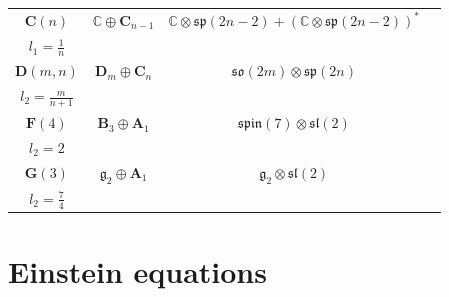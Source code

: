 \documentclass[reqno]{amsart}
\theoremstyle{definition}
\begin{document}
\begin{table}[htbp]
{{\begin{tabular}{|c|c|c|c|}
\\
\hline
$\mathbf{C}(n)$  &  $\mathbb{C}\oplus \mathbf{C}_{n-1}$                       &  $\mathbb{C}\otimes\mathfrak{sp}(2n-2)+(\mathbb{C}\otimes\mathfrak{sp}(2n-2))^{\ast}$
                                                                              &  \makecell{$l_{0}=\infty$\\
                                                                                           $l_{1}=\frac{1}{n}$}
\\
\hline
$\mathbf{D}(m,n)$  &  $\mathbf{D}_{m}\oplus \mathbf{C}_{n}$  & $\mathfrak{so}(2m)\otimes\mathfrak{sp}(2n)$
                                                                              &  \makecell{$l_{1}=\frac{n}{m-1}$\\
                                                                                           $l_{2}=\frac{m}{n+1}$}
\\
\hline
$\mathbf{F}(4)$  &  $\mathbf{B}_{3}\oplus \mathbf{A}_{1}$  & $\mathfrak{spin}(7)\otimes\mathfrak{sl}(2)$
                                                                              &  \makecell{$l_{1}=\frac{2}{5}$\\
                                                                                           $l_{2}=2$}
\\
\hline
$\mathbf{G}(3)$  &  $\mathfrak{g}_{2}\oplus \mathbf{A}_{1}$  & $\mathfrak{g}_{2}\otimes\mathfrak{sl}(2)$
                                                                              &  \makecell{$l_{1}=\frac{1}{2}$\\
                                                                                           $l_{2}=\frac{7}{4}$}
\\
\hline
\end{tabular}}}
\end{table}

\section{Einstein equations}\label{sect3}
\end{document}
